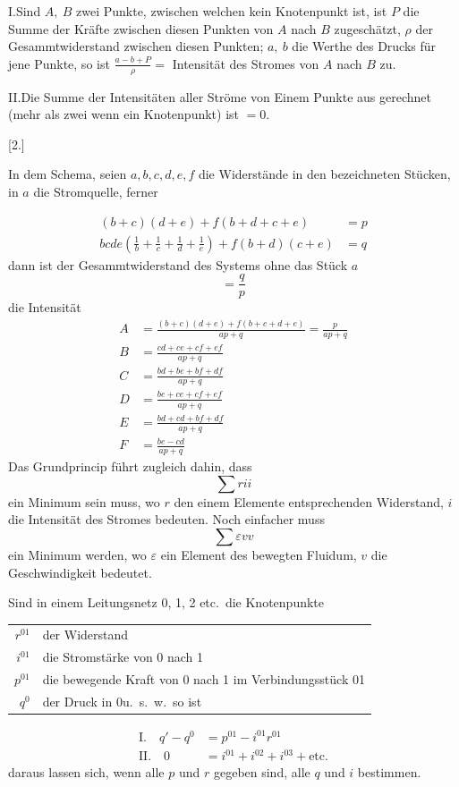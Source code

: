 I.\quad Sind $A,\ B$ zwei Punkte, zwischen welchen kein Knotenpunkt ist, ist $P$ die Summe der Kräfte zwischen diesen Punkten von $A$ nach $B$ zugeschätzt, $\rho$ der Gesammtwiderstand zwischen diesen Punkten; $a,\ b$ die Werthe des Drucks für jene Punkte, so ist $\frac{a-b+P}{\rho}=$ Intensität des Stromes von $A$ nach $B$ zu.

II.\quad Die Summe der Intensitäten aller Ströme von Einem Punkte aus gerechnet (mehr als zwei wenn ein Knotenpunkt) ist $=0$.

\begin{center}[2.]\end{center}
In dem Schema, seien $a,b,c,d,e,f$ die Widerstände in den bezeichneten Stücken, in $a$ die Stromquelle, ferner
\begin{center}\resizebox{.28\linewidth}{!}{}\end{center}
\[
\begin{aligned}
(b+c)(d+e)+f(b+d+c+e)&=p\\
bcde\left(\frac{1}{b}+\frac{1}{c}+\frac{1}{d}+\frac{1}{e}\right)+f(b+d)(c+e)&=q
\end{aligned}
\]
dann ist der Gesammtwiderstand des Systems ohne das Stück $a$
\[
=\frac{q}{p}
\]
die Intensität
\[
\begin{aligned}
A&=\frac{(b+c)(d+e)+f(b+c+d+e)}{ap+q}=\frac{p}{ap+q}\\[4pt]
B&=\frac{cd+ce+cf+ef}{ap+q}\\[4pt]
C&=\frac{bd+be+bf+df}{ap+q}\\[4pt]
D&=\frac{be+ce+cf+ef}{ap+q}\\[4pt]
E&=\frac{bd+cd+bf+df}{ap+q}\\[4pt]
F&=\frac{be-cd}{ap+q}
\end{aligned}
\]
Das Grundprincip führt zugleich dahin, dass
\[
\sum rii
\]
ein Minimum sein muss, wo $r$ den einem Elemente entsprechenden Widerstand, $i$ die Intensität des Stromes bedeuten. Noch einfacher muss
\[
\sum\varepsilon vv
\]
ein Minimum werden, wo $\varepsilon$ ein Element des bewegten Fluidum, $v$ die Geschwindigkeit bedeutet.

Sind in einem Leitungsnetz 0, 1, 2 etc.\ die Knotenpunkte
\begin{center}\begin{tabular}{rl}
$r^{01}$ & der Widerstand\\
$i^{01}$ & die Stromstärke von 0 nach 1\\
$p^{01}$ & die bewegende Kraft von 0 nach 1 im Verbindungsstück 01\\
$q^0$ & der Druck in 0\quad u.\ s.\ w.\ so ist
\end{tabular}\end{center}
\[
\begin{aligned}
\text{I.}\quad q'-q^0&=p^{01}-i^{01}r^{01}\\
\text{II.}\quad 0&=i^{01}+i^{02}+i^{03}+\text{etc.}
\end{aligned}
\]
daraus lassen sich, wenn alle $p$ und $r$ gegeben sind, alle $q$ und $i$ bestimmen.

